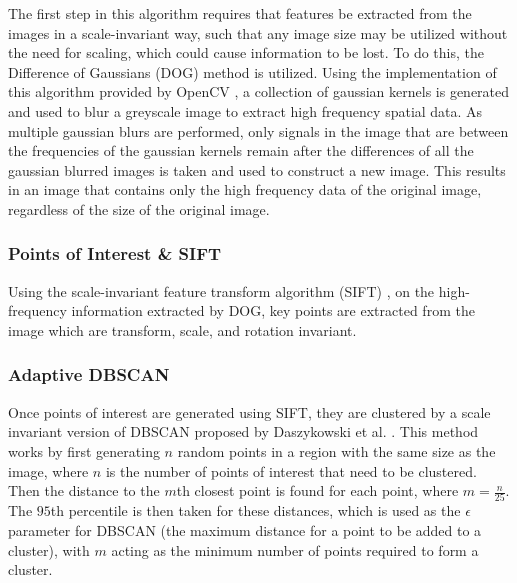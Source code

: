 The first step in this algorithm requires that features be extracted from the images in a scale-invariant way, such that any image size may be utilized without the need for scaling, which could cause information to be lost. To do this, the Difference of Gaussians (DOG) method is utilized. Using the implementation of this algorithm provided by OpenCV \cite{OpenCV}, a collection of gaussian kernels is generated and used to blur a greyscale image to extract high frequency spatial data. As multiple gaussian blurs are performed, only signals in the image that are between the frequencies of the gaussian kernels remain after the differences of all the gaussian blurred images is taken and used to construct a new image. This results in an image that contains only the high frequency data of the original image, regardless of the size of the original image.

\subsubsection{Points of Interest \& SIFT}

Using the scale-invariant feature transform algorithm (SIFT) \cite{Lowe}, on the high-frequency information extracted by DOG, key points are extracted from the image which are transform, scale, and rotation invariant.


\subsubsection{Adaptive DBSCAN}

Once points of interest are generated using SIFT, they are clustered by a scale invariant version of DBSCAN proposed by Daszykowski et al. \cite{Daszykowski}. This method works by first generating $n$ random points in a region with the same size as the image, where $n$ is the number of points of interest that need to be clustered. Then the distance to the $m$th closest point is found for each point, where $m = \frac{n}{25}$. The $95$th percentile is then taken for these distances, which is used as the $\epsilon$ parameter for DBSCAN (the maximum distance for a point to be added to a cluster), with $m$ acting as the minimum number of points required to form a cluster.


